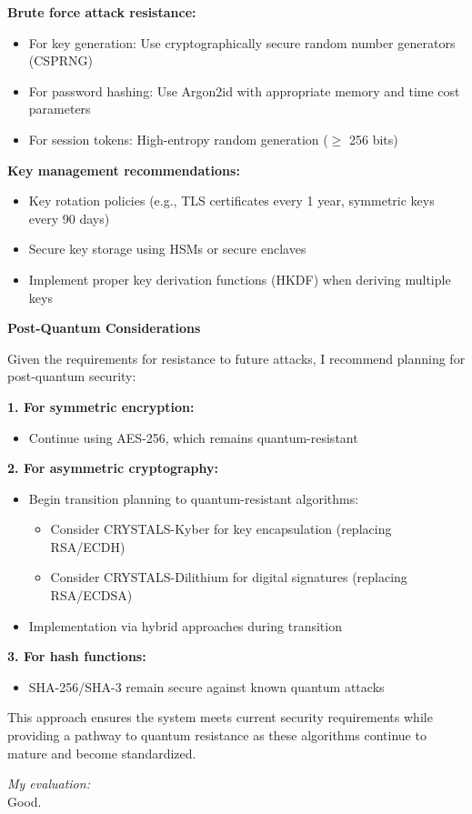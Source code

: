 \documentclass{article}
\begin{document}
\begin{enumerate}[label=\textbf{Task \arabic*:}]
\begin{tcolorbox}
		\noindent\textbf{Brute force attack resistance:}
		\begin{itemize}
			\item For key generation: Use cryptographically secure random number generators (CSPRNG)
			\item For password hashing: Use Argon2id with appropriate memory and time cost parameters
			\item For session tokens: High-entropy random generation ($\geq$ 256 bits)
		\end{itemize}
		
		\noindent\textbf{Key management recommendations:}
		\begin{itemize}
			\item Key rotation policies (e.g., TLS certificates every 1 year, symmetric keys every 90 days)
			\item Secure key storage using HSMs or secure enclaves
			\item Implement proper key derivation functions (HKDF) when deriving multiple keys
		\end{itemize}
		
		\bigskip
		\noindent\textbf{\large Post-Quantum Considerations}
		
		\noindent Given the requirements for resistance to future attacks, I recommend planning for post-quantum security:
		
		\medskip
		\noindent\textbf{1. For symmetric encryption:}
		\begin{itemize}
			\item Continue using AES-256, which remains quantum-resistant
		\end{itemize}
		
		\noindent\textbf{2. For asymmetric cryptography:}
		\begin{itemize}
			\item Begin transition planning to quantum-resistant algorithms:
			\begin{itemize}
				\item Consider CRYSTALS-Kyber for key encapsulation (replacing RSA/ECDH)
				\item Consider CRYSTALS-Dilithium for digital signatures (replacing RSA/ECDSA)
			\end{itemize}
			\item Implementation via hybrid approaches during transition
		\end{itemize}
		
		\noindent\textbf{3. For hash functions:}
		\begin{itemize}
			\item SHA-256/SHA-3 remain secure against known quantum attacks
		\end{itemize}
		
		\medskip
		\noindent This approach ensures the system meets current security requirements while providing a pathway to quantum resistance as these algorithms continue to mature and become standardized.
		\end{tcolorbox}
		
		\textit{My evaluation:}\\
		Good.
	\end{enumerate}
	
	\printbibliography
\end{document}
